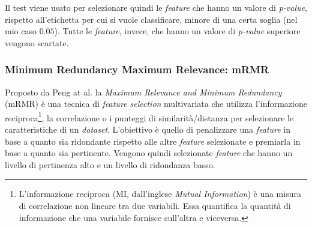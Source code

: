 \documentclass[12pt,italian]{report}
\begin{document}
	Il test viene usato per selezionare quindi le \textit{feature} che hanno un valore di \textit{p-value}, rispetto all'etichetta per cui si vuole classificare, minore di una certa soglia (nel mio caso $0.05$). Tutte le \textit{feature}, invece, che hanno un valore di \textit{p-value} superiore vengono scartate.
	
	\subsubsection{Minimum Redundancy Maximum Relevance: mRMR}
	\label{mrmr}
	Proposto da Peng at al. \cite{1453511} la \textit{Maximum Relevance and Minimum Redundancy} (mRMR) è una tecnica di \textit{feature selection } multivariata che utilizza l'informazione reciproca\footnote{L'informazione reciproca (MI, dall'inglese \textit{Mutual Information}) è una misura di correlazione non lineare tra due variabili. Essa quantifica la quantità di informazione che una variabile fornisce sull'altra e viceversa.}, la correlazione o i punteggi di similarità/distanza per selezionare le caratteristiche di un \textit{dataset}. L'obiettivo è quello di penalizzare una \textit{feature} in base a quanto sia ridondante rispetto alle altre \textit{feature} selezionate e premiarla in base a quanto sia pertinente. Vengono quindi selezionate \textit{feature} che hanno un livello di pertinenza alto e un livello di ridondanza basso. 
	
\end{document}
